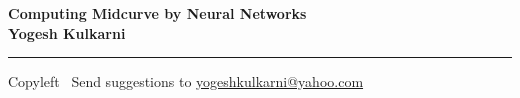 
\graphicspath{{images/}}

\footnotesize


\begin{center}
\Large{\textbf{Computing Midcurve by Neural Networks\\ Yogesh Kulkarni}}  
\end{center}

\begin{multicols}{2}

\end{multicols}

\rule{\linewidth}{0.25pt}
\scriptsize
Copyleft \textcopyleft\  Send suggestions to 
\href{http://www.yogeshkulkarni.com}{yogeshkulkarni@yahoo.com}


